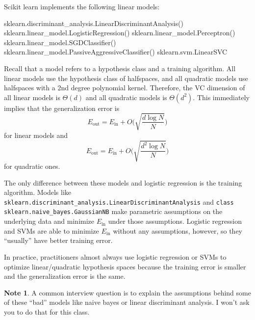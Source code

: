 \documentclass[10pt]{exam}
\theoremstyle{definition}
\newtheorem{note}{Note}
\newtheorem{fact}{Fact}
\newcommand{\Ein}{E_{\text{in}}}
\newcommand{\Eout}{E_{\text{out}}}
\begin{document}
Scikit learn implements the following linear models:

\begin{code}
sklearn.discriminant_analysis.LinearDiscriminantAnalysis()
sklearn.linear_model.LogisticRegression()
sklearn.linear_model.Perceptron()
sklearn.linear_model.SGDClassifier()
sklearn.linear_model.PassiveAggressiveClassifier()
sklearn.svm.LinearSVC
\end{code}

    Recall that a model refers to a hypothesis class and a training algorithm.
    All linear models use the hypothesis class of halfspaces, and all quadratic models use halfspaces with a 2nd degree polynomial kernel.
    Therefore, the VC dimension of all linear models is $\Theta(d)$ and all quadratic models is $\Theta(d^2)$.
    This immediately implies that the generalization error is
    \begin{equation}
        \Eout = \Ein + O\bigg(\sqrt{\frac{d\log N}{N}}\bigg)
    \end{equation}
    for linear models and
    \begin{equation}
        \Eout = \Ein + O\bigg(\sqrt{\frac{d^2\log N}{N}}\bigg)
    \end{equation}
    for quadratic ones.

    The only difference between these models and logistic regression is the training algorithm.
    Models like \lstinline{sklearn.discriminant_analysis.LinearDiscriminantAnalysis} and \lstinline{class sklearn.naive_bayes.GaussianNB} make parametric assumptions on the underlying data and minimize $\Ein$ under those assumptions.
    Logistic regression and SVMs are able to minimize $\Ein$ without any assumptions, however, so they ``usually'' have better training error.

    In practice, practitioners almost always use logistic regression or SVMs to optimize linear/quadratic hypothesis spaces because the training error is smaller and the generalization error is the same.


    \vspace{5in}
\begin{note}
    A common interview question is to explain the assumptions behind some of these ``bad'' models like naive bayes or linear discriminant analysis.
    I won't ask you to do that for this class.
\end{note}
\end{document}
